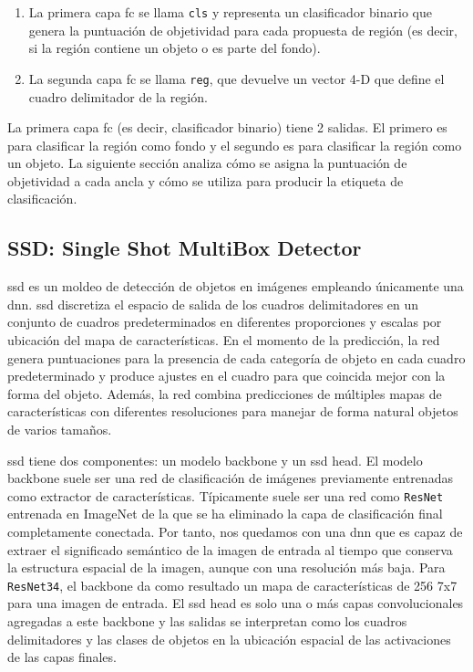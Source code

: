 \begin{enumerate}
    \item La primera capa \gls{fc} se llama \texttt{cls} y representa un clasificador binario que genera la puntuación de objetividad para cada propuesta de región (es decir, si la región contiene un objeto o es parte del fondo).
    \item La segunda capa \gls{fc} se llama \texttt{reg}, que devuelve un vector 4-D que define el cuadro delimitador de la región.
\end{enumerate}

La primera capa \gls{fc} (es decir, clasificador binario) tiene 2 salidas. El primero es para clasificar la región como fondo y el segundo es para clasificar la región como un objeto. La siguiente sección analiza cómo se asigna la puntuación de objetividad a cada ancla y cómo se utiliza para producir la etiqueta de clasificación.

\subsection{SSD: Single Shot MultiBox Detector}
\label{subsec:ssd}

\gls{ssd} \cite{Liu_2016} es un moldeo de detección de objetos en imágenes empleando únicamente una \gls{dnn}. \gls{ssd} discretiza el espacio de salida de los cuadros delimitadores en un conjunto de cuadros predeterminados en diferentes proporciones y escalas por ubicación del mapa de características. En el momento de la predicción, la red genera puntuaciones para la presencia de cada categoría de objeto en cada cuadro predeterminado y produce ajustes en el cuadro para que coincida mejor con la forma del objeto. Además, la red combina predicciones de múltiples mapas de características con diferentes resoluciones para manejar de forma natural objetos de varios tamaños.

\gls{ssd} tiene dos componentes: un modelo backbone y un \gls{ssd} head. El modelo backbone suele ser una red de clasificación de imágenes previamente entrenadas como extractor de características. Típicamente suele ser una red como \texttt{ResNet} entrenada en ImageNet \cite{russakovsky2015imagenet} de la que se ha eliminado la capa de clasificación final completamente conectada. Por tanto, nos quedamos con una \gls{dnn} que es capaz de extraer el significado semántico de la imagen de entrada al tiempo que conserva la estructura espacial de la imagen, aunque con una resolución más baja. Para \texttt{ResNet34}, el backbone da como resultado un mapa de características de 256 7x7 para una imagen de entrada. El \gls{ssd} head es solo una o más capas convolucionales agregadas a este backbone y las salidas se interpretan como los cuadros delimitadores y las clases de objetos en la ubicación espacial de las activaciones de las capas finales.

